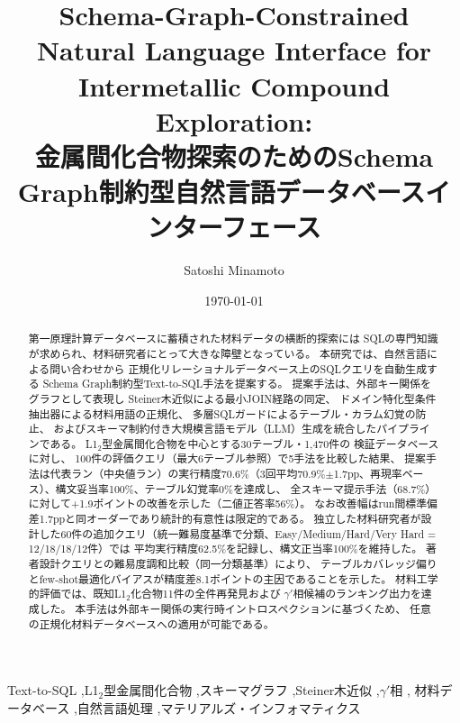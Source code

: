 \documentclass[5p,twocolumn]{elsarticle}
\begin{document}
\begin{frontmatter}

\title{Schema-Graph-Constrained Natural Language Interface for Intermetallic Compound Exploration:\\
  金属間化合物探索のためのSchema Graph制約型自然言語データベースインターフェース}

\author[nims]{Satoshi Minamoto}
\address[nims]{National Institute for Materials Science (NIMS),
  1-2-1 Sengen, Tsukuba, Ibaraki 305-0047, Japan}

\date{\today}

\begin{abstract}
第一原理計算データベースに蓄積された材料データの横断的探索には
SQLの専門知識が求められ、材料研究者にとって大きな障壁となっている。
本研究では、自然言語による問い合わせから
正規化リレーショナルデータベース上のSQLクエリを自動生成する
Schema Graph制約型Text-to-SQL手法を提案する。
提案手法は、外部キー関係をグラフとして表現し
Steiner木近似による最小JOIN経路の同定、
ドメイン特化型条件抽出器による材料用語の正規化、
多層SQLガードによるテーブル・カラム幻覚の防止、
およびスキーマ制約付き大規模言語モデル（LLM）生成を統合したパイプラインである。
L1$_2$型金属間化合物を中心とする30テーブル・1{,}470件の
検証データベースに対し、
100件の評価クエリ（最大6テーブル参照）で5手法を比較した結果、
提案手法は代表ラン（中央値ラン）の実行精度70.6\%（3回平均70.9\%$\pm$1.7pp、再現率ベース）、構文妥当率100\%、テーブル幻覚率0\%を達成し、
全スキーマ提示手法（68.7\%）に対して+1.9ポイントの改善を示した（二値正答率56\%）。
なお改善幅はrun間標準偏差1.7ppと同オーダーであり統計的有意性は限定的である。
独立した材料研究者が設計した60件の追加クエリ（統一難易度基準で分類、Easy/Medium/Hard/Very Hard = 12/18/18/12件）では
平均実行精度62.5\%を記録し、構文正当率100\%を維持した。
著者設計クエリとの難易度調和比較（同一分類基準）により、
テーブルカバレッジ偏りとfew-shot最適化バイアスが精度差8.1ポイントの主因であることを示した。
材料工学的評価では、既知L1$_2$化合物11件の全件再発見および
$\gamma'$相候補のランキング出力を達成した。
本手法は外部キー関係の実行時イントロスペクションに基づくため、
任意の正規化材料データベースへの適用が可能である。

\end{abstract}

\begin{keyword}
Text-to-SQL \sep L1$_2$型金属間化合物 \sep スキーマグラフ \sep Steiner木近似 \sep $\gamma'$相 \sep
材料データベース \sep 自然言語処理 \sep マテリアルズ・インフォマティクス
\end{keyword}

\end{frontmatter}
\end{document}
